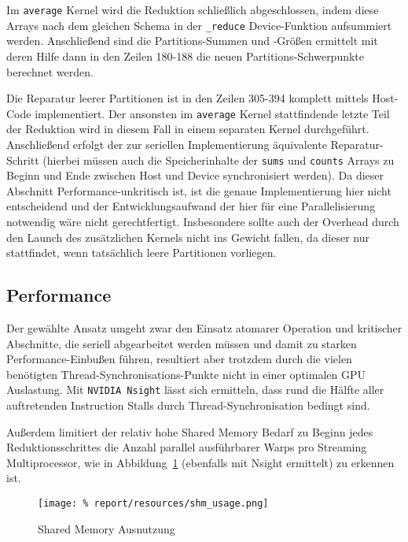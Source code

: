 \documentclass[
    bibliography=totoc, cd=lightcolor, cdmath=false, ngerman]{tudscrreprt}
\begin{document}
\vspace{20pt}

Im \texttt{average} Kernel wird die Reduktion schließlich abgeschlossen, indem
diese Arrays nach dem gleichen Schema in der \texttt{\_reduce} Device-Funktion
aufsummiert werden. Anschließend sind die Partitions-Summen und -Größen
ermittelt mit deren Hilfe dann in den Zeilen 180-188 die neuen
Partitions-Schwerpunkte berechnet werden.

Die Reparatur leerer Partitionen ist in den Zeilen 305-394 komplett mittels
Host-Code implementiert. Der ansonsten im \texttt{average} Kernel stattfindende
letzte Teil der Reduktion wird in diesem Fall in einem separaten Kernel
durchgeführt.  Anschließend erfolgt der zur seriellen Implementierung
äquivalente Reparatur-Schritt (hierbei müssen auch die Speicherinhalte der
\texttt{sums} und \texttt{counts} Arrays zu Beginn und Ende zwischen Host und
Device synchronisiert werden). Da dieser Abschnitt Performance-unkritisch ist,
ist die genaue Implementierung hier nicht entscheidend und der
Entwicklungsaufwand der hier für eine Parallelisierung notwendig wäre nicht
gerechtfertigt. Insbesondere sollte auch der Overhead durch den Launch des
zusätzlichen Kernels nicht ins Gewicht fallen, da dieser nur stattfindet, wenn
tatsächlich leere Partitionen vorliegen.

\subsection{Performance}

Der gewählte Ansatz umgeht zwar den Einsatz atomarer Operation und kritischer
Abschnitte, die seriell abgearbeitet werden müssen und damit zu starken
Performance-Einbußen führen, resultiert aber trotzdem durch die vielen
benötigten Thread-Synchronisations-Punkte nicht in einer optimalen GPU
Auslastung. Mit \texttt{NVIDIA Nsight} lässt sich ermitteln, dass rund die
Hälfte aller auftretenden Instruction Stalls durch Thread-Synchronisation
bedingt sind.

Außerdem limitiert der relativ hohe Shared Memory Bedarf zu Beginn
jedes Reduktionsschrittes die Anzahl parallel ausführbarer Warps pro Streaming
Multiprocessor, wie in Abbildung~\ref{fig:shm} (ebenfalls mit Nsight ermittelt)
zu erkennen ist.

\begin{figure}[htbp]
  \begin{center}
    \texttt{[image: \%
    report/resources/shm\_usage.png]}
  \end{center}
  \caption{Shared Memory Ausnutzung}
  \label{fig:shm}
\end{figure}
\end{document}
